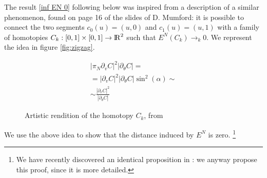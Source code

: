 \documentclass[twoside,a4paper,english]{article}
\def\derpar#1{\partial_{#1}}
\begin{document}
The result \ref{inf EN 0} following below
was inspired from a description 
of a similar phenomenon, found  on page 16 of the
slides  \cite{Mumford:Gibbs} of D. Mumford: 
it is possible to connect the two segments
$c_0(u)=(u,0)$ and $c_1(u)=(u,1)$ with a family of
homotopies $C_k:[0,1]\times[0,1]\to {\protect\mathrm{l\hskip-0.15em R}}^2$ such that $E^N(C_k)\to_k 0$.
We represent the idea in figure \vref{fig:zigzag}.
\begin{figure}[htbp]
  \begin{minipage}[tr]{.5\textwidth}
    \hfill 
  \end{minipage}
  \begin{minipage}[tr]{.5\textwidth}
    
    \begin{eqnarray*}
      |\pi_N \derpar v C|^2 |\derpar \theta C|=
      \\ = |\derpar v C |^2|\derpar\theta C|\sin^2(\alpha)\sim
      \\ \sim \frac {|\derpar v C |^2}{ |\derpar\theta C|}
    \end{eqnarray*}
  \end{minipage}
  \caption{Artistic rendition of the homotopy $C_k$, from  \cite{Mumford:Gibbs}}
  \label{fig:zigzag}
\end{figure}

We use the above idea to show that the distance induced
by $E^N$ is zero.
\footnote{
  We have recently discovered an identical proposition in
  \cite{Michor-Mumford}: we anyway propose this proof, since it is more
  detailed.
}
\end{document}
